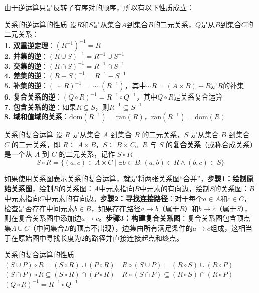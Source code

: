 由于逆运算只是反转了有序对的顺序，所以有以下性质成立：
\begin{theorem}{关系的逆运算的性质}{}
设$R$和$S$是从集合$A$到集合$B$的二元关系，$Q$是从$B$到集合$C$的二元关系：\\
\textbf{1. 双重逆定理}：$(R^{-1})^{-1} = R$\\
\textbf{2. 并集的逆}：$(R \cup S)^{-1} = R^{-1} \cup S^{-1}$\\
\textbf{3. 交集的逆}：$(R \cap S)^{-1} = R^{-1} \cap S^{-1}$\\
\textbf{4. 差集的逆}：$(R - S)^{-1} = R^{-1} - S^{-1}$\\
\textbf{5. 补集的逆}：$(\sim R)^{-1} = \sim (R^{-1})$，其中$\sim R = (A \times B) - R$是$R$的补集\\
\textbf{6. 复合关系的逆}：$(Q \circ R)^{-1} = R^{-1} \circ Q^{-1}$，其中$Q \circ R$是关系复合运算\\
\textbf{7. 包含关系的逆}：如果$R \subseteq S$，则$R^{-1} \subseteq S^{-1}$\\
\textbf{8. 域和值域的关系}：$\text{dom}(R^{-1}) = \text{ran}(R)$，$\text{ran}(R^{-1}) = \text{dom}(R)$
\end{theorem}
\begin{definition}{关系的复合运算}{}
设 $R$ 是从集合 $A$ 到集合 $B$ 的二元关系，$S$ 是从集合 $B$ 到集合 $C$ 的二元关系，即 $R \subseteq A \times B$，$S \subseteq B \times C$。$R$ 与 $S$ 的\textbf{复合关系}（或称合成关系）是一个从 $A$ 到 $C$ 的二元关系，记作 $S \circ R$\vspace{-10pt}
\[
S \circ R = \{(a, c)\in A \times C \mid \exists b \in B : (a, b) \in R \land (b, c) \in S\}
\]
\end{definition}
如果使用关系图表示关系的复合运算，就是将两张关系图“合并”，\textbf{步骤1：绘制原始关系图}，绘制$R$的关系图：$A$中元素指向$B$中元素的有向边，绘制$S$的关系图：$B$中元素指向$C$中元素的有向边。\textbf{步骤2：寻找连接路径}：对于每个$a \in A$和$c \in C$，检查是否存在中间元素$b \in B$，如果存在路径$a \rightarrow b$（属于$R$）和$b \rightarrow c$（属于$S$），则在复合关系图中添加边$a \rightarrow c$。\textbf{步骤3：构建复合关系图}：复合关系图包含顶点集$A \cup C$（中间集合$B$的顶点不出现），边集由所有满足条件的$a \rightarrow c$组成，这相当于在原始图中寻找长度为2的路径并直接连接起点和终点。
\begin{theorem}{关系的复合运算的性质}{}
    $(S\cup P)\circ R=(S\circ R)\cup(P\circ R)\quad R\circ(S\cup P)=(R\circ S)\cup(R\circ P)$\\
    $(S\cap P)\circ R\subseteq(S\circ R)\cap(P\circ R)\quad R\circ(S\cap P)\subseteq(R\circ S)\cap(R\circ P)$\\
    $(Q \circ R)^{-1} = R^{-1} \circ Q^{-1}$
\end{theorem}
